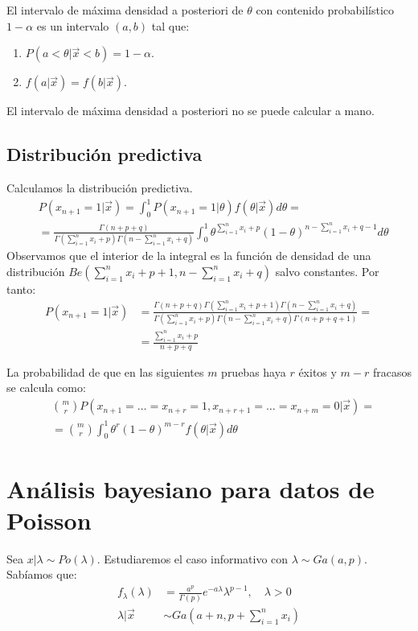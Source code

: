 El intervalo de máxima densidad a posteriori de $\theta$ con contenido probabilístico $1-\alpha$ es un intervalo $(a, b)$ tal que:
\begin{enumerate}
    \item $P(a < \theta|\vec{x} < b) = 1-\alpha$.
    \item $f(a|\vec{x}) = f(b|\vec{x})$.
\end{enumerate}

\begin{note}
    El intervalo de máxima densidad a posteriori no se puede calcular a mano.
\end{note}

\subsection*{Distribución predictiva}
Calculamos la distribución predictiva.
\begin{align*}
     & P(x_{n+1} = 1|\vec{x}) = \int_0^1 P(x_{n+1} = 1|\theta)f(\theta|\vec{x})d\theta =                                                                                        \\
     & = \frac{\Gamma(n+p+q)}{\Gamma(\sum_{i=1}^n x_i + p)\Gamma(n - \sum_{i=1}^n x_i + q)} \int_0^1 \theta^{\sum_{i=1}^n x_i + p}(1-\theta)^{n - \sum_{i=1}^n x_i +q-1}d\theta
\end{align*}
Observamos que el interior de la integral es la función de densidad de una distribución $Be(\sum_{i=1}^n x_i + p+1, n - \sum_{i=1}^n x_i + q)$ salvo constantes.
Por tanto:
\begin{align*}
    P(x_{n+1} = 1|\vec{x}) & = \frac{\Gamma(n+p+q)\Gamma(\sum_{i=1}^n x_i+p+1)\Gamma(n - \sum_{i=1}^n x_i + q)}{\Gamma(\sum_{i=1}^n x_i + p)\Gamma(n - \sum_{i=1}^n x_i + q)\Gamma(n+p+q+1)} = \\
                           & = \frac{\sum_{i=1}^n x_i+p}{n+p+q}
\end{align*}

La probabilidad de que en las siguientes $m$ pruebas haya $r$ éxitos y $m-r$ fracasos se calcula como:
\begin{align*}
     & \binom{m}{r}P(x_{n+1} = \dots = x_{n+r} = 1, x_{n+r+1} = \dots = x_{n+m} = 0|\vec{x}) = \\
     & = \binom{m}{r} \int_0^1 \theta^r(1-\theta)^{m-r}f(\theta|\vec{x})d\theta
\end{align*}

\section{Análisis bayesiano para datos de Poisson}
Sea $x|\lambda \sim Po(\lambda)$.
Estudiaremos el caso informativo con $\lambda \sim Ga(a, p)$.
Sabíamos que:
\begin{align*}
    f_\lambda(\lambda) & = \frac{a^p}{\Gamma(p)} e^{-a\lambda}\lambda^{p-1}, \quad \lambda > 0 \\
    \lambda|\vec{x}    & \sim Ga(a+n, p+\sum_{i=1}^n x_i)
\end{align*}

